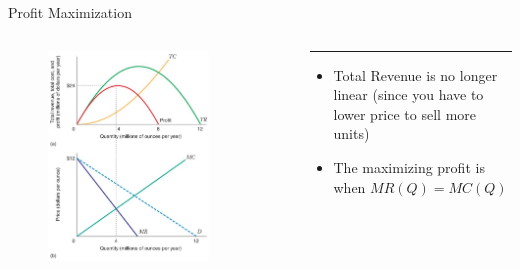 \documentclass[11pt,t]{beamer}
\begin{document}
\begin{frame}{Profit Maximization}
  \begin{columns}[T]
    \vspace{0pt}
    \begin{column}{.55\textwidth}
      \begin{figure}
        \includegraphics[width=0.8\textwidth]{figures/fig11_2.jpg}
      \end{figure}
  
      \vspace*{50mm} %
    \end{column}
    
    \hfill
    
    \begin{column}{.45\textwidth}
      {\color{accent}\rule{\linewidth}{2pt}}
  
      \begin{itemize}
        \item Total Revenue is no longer linear (since you have to lower price to sell more units)
        
        \item The maximizing profit is when $MR(Q) = MC(Q)$
      \end{itemize}
    \end{column}
  \end{columns}
\end{frame}
\end{document}
